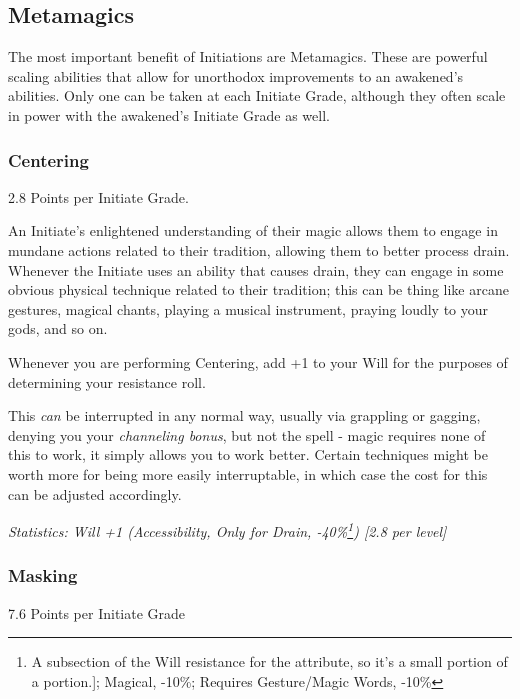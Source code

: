 \begin{multicols}{3}
	\subsection{Metamagics}
	
	The most important benefit of Initiations are Metamagics. These are powerful scaling abilities that allow for unorthodox improvements to an awakened's abilities. Only one can be taken at each Initiate Grade, although they often scale in power with the awakened's Initiate Grade as well.
	
	\subsubsection{Centering}
	\begin{flushright}
		2.8 Points per Initiate Grade.
	\end{flushright}
	
	An Initiate's enlightened understanding of their magic allows them to engage in mundane actions related to their tradition, allowing them to better process drain. Whenever the Initiate uses an ability that causes drain, they can engage in some obvious physical technique related to their tradition; this can be thing like arcane gestures, magical chants, playing a musical instrument,  praying loudly to your gods, and so on. 
	
	Whenever you are performing Centering, add +1 to your Will for the purposes of determining your resistance roll.
	
	This \textit{can} be interrupted in any normal way, usually via grappling or gagging, denying you your \textit{channeling bonus}, but not the spell - magic requires none of this to work, it simply allows you to work better. Certain techniques might be worth more for being more easily interruptable, in which case the cost for this can be adjusted accordingly.
	
	\textcolor{OliveGreen}{\textit{Statistics: Will +1 (Accessibility, Only for Drain, -40\%\footnote{A subsection of the Will resistance for the attribute, so it's a small portion of a portion.]; Magical, -10\%; Requires Gesture/Magic Words, -10\%}) [2.8 per level] }}
	
	\subsubsection{Masking}
	\begin{flushright}
		7.6 Points per Initiate Grade
	\end{flushright}


\end{multicols}

